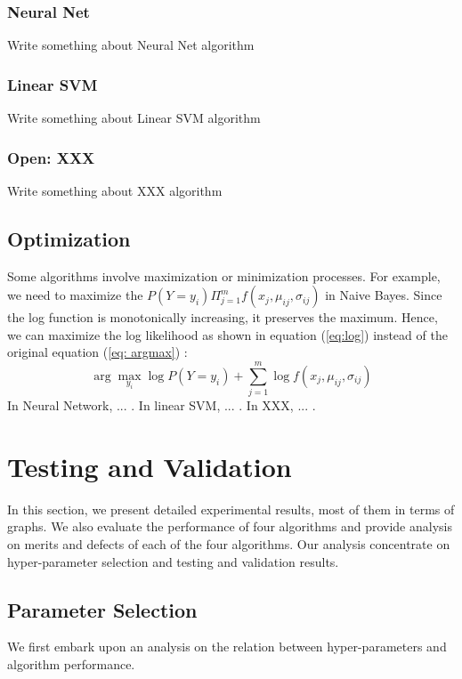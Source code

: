 \documentclass{acm_proc_article-sp}
\begin{document}
\subsubsection{Neural Net}
Write something about Neural Net algorithm

\subsubsection{Linear SVM }
Write something about Linear SVM algorithm

\subsubsection{Open: XXX}
Write something about XXX algorithm

\subsection{Optimization}
Some algorithms involve maximization or minimization processes. For example, we need to maximize the $P(Y = y_i) \Pi_{j=1}^m f (x_j, \mu_{ij}, \sigma_{ij} )$ in Naive Bayes. Since the log function is monotonically increasing, it preserves the maximum. Hence, we can maximize the log likelihood as shown in equation (\ref{eq:log}) instead of the original equation (\ref{eq: argmax}) :
\begin{equation}
\arg \max_{y_i} \log P(Y = y_i) + \sum_{j=1}^m \log f (x_j, \mu_{ij}, \sigma_{ij} ) \label{eq:log}
\end{equation}
In Neural Network, ... . In linear SVM, ... . In XXX, ... .








\section{Testing and Validation}
In this section, we present detailed experimental results, most of them in terms of graphs. We also evaluate the performance of four algorithms and provide analysis on merits and defects of each of the four algorithms. Our analysis concentrate on hyper-parameter selection and testing and validation results.

\subsection{Parameter Selection}
We first embark upon an analysis on the relation between hyper-parameters and algorithm performance.
 
\end{document}
